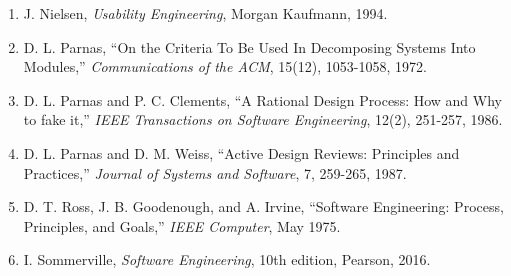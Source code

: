 \begin{enumerate}
  \item J. Nielsen, \textit{Usability Engineering}, Morgan Kaufmann, 1994.
  \item D. L. Parnas, “On the Criteria To Be Used In Decomposing Systems Into Modules,” \textit{Communications of the ACM}, 15(12), 1053-1058, 1972.
  \item D. L. Parnas and P. C. Clements, “A Rational Design Process: How and Why to fake it,” \textit{IEEE Transactions on Software Engineering}, 12(2), 251-257, 1986.
  \item D. L. Parnas and D. M. Weiss, “Active Design Reviews: Principles and Practices,” \textit{Journal of Systems and Software}, 7, 259-265, 1987.
  \item D. T. Ross, J. B. Goodenough, and A. Irvine, “Software Engineering: Process, Principles, and Goals,” \textit{IEEE Computer}, May 1975.
  \item I. Sommerville, \textit{Software Engineering}, 10th edition, Pearson, 2016.
\end{enumerate}

